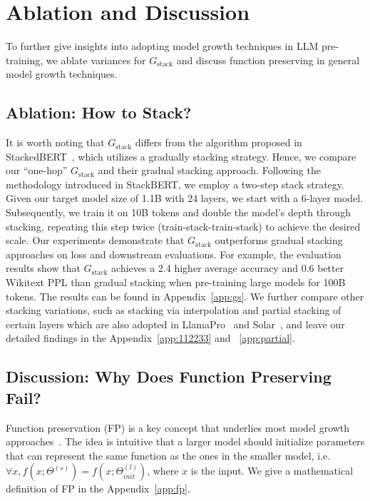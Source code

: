 \documentclass{article}
\begin{document}
\section{Ablation and Discussion}\label{sec:discussion}

To further give insights into adopting model growth techniques in LLM pre-training, we ablate variances for $G_{\text{stack}}$ and discuss function preserving in general model growth techniques.

\subsection{Ablation: How to Stack?}

It is worth noting that $G_{\text{stack}}$ differs from the algorithm proposed in StackedBERT~\cite{gong2019efficient}, which utilizes a gradually stacking strategy.
Hence, we compare our ``one-hop'' $G_{\text{stack}}$ and their gradual stacking approach.
Following the methodology introduced in StackBERT, we employ a two-step stack strategy. Given our target model size of 1.1B with 24 layers, we start with a 6-layer model.
Subsequently, we train it on 10B tokens and double the model's depth through stacking, repeating this step twice (train-stack-train-stack) to achieve the desired scale.
Our experiments demonstrate that $G_{\text{stack}}$ outperforms gradual stacking approaches on loss and downstream evaluations.
For example, the evaluation results show that $G_{\text{stack}}$ achieves a 2.4 higher average accuracy and 0.6 better Wikitext PPL than gradual stacking when pre-training large models for 100B tokens.
The results can be found in Appendix~\ref{app:gs}.
We further compare other stacking variations, such as stacking via interpolation and partial stacking of certain layers which are also adopted in LlamaPro~\cite{wu2024llama} and Solar~\cite{kim2023solar}, and leave our detailed findings in the Appendix~\ref{app:112233} and ~\ref{app:partial}. 


\subsection{Discussion: Why Does Function Preserving Fail?}

Function preservation (FP) is a key concept that underlies most model growth approaches~\cite{chen2015net2net, chen2021bert2bert, wang2023lemon, yao2024masked}.
The idea is intuitive that a larger model should initialize parameters that can represent the same function as the ones in the smaller model, i.e. $\forall x, f(x;\Theta^{(s)})=f(x;\Theta^{(l)}_{init})$, where $x$ is the input. 
We give a mathematical definition of FP in the Appendix~\ref{app:fp}.
\end{document}
